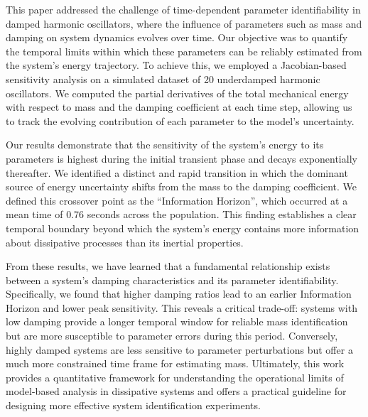 \documentclass[]{article}
\begin{document}
This paper addressed the challenge of time-dependent parameter identifiability in damped harmonic oscillators, where the influence of parameters such as mass and damping on system dynamics evolves over time. Our objective was to quantify the temporal limits within which these parameters can be reliably estimated from the system's energy trajectory. To achieve this, we employed a Jacobian-based sensitivity analysis on a simulated dataset of 20 underdamped harmonic oscillators. We computed the partial derivatives of the total mechanical energy with respect to mass and the damping coefficient at each time step, allowing us to track the evolving contribution of each parameter to the model's uncertainty.

Our results demonstrate that the sensitivity of the system's energy to its parameters is highest during the initial transient phase and decays exponentially thereafter. We identified a distinct and rapid transition in which the dominant source of energy uncertainty shifts from the mass to the damping coefficient. We defined this crossover point as the ``Information Horizon'', which occurred at a mean time of 0.76 seconds across the population. This finding establishes a clear temporal boundary beyond which the system's energy contains more information about dissipative processes than its inertial properties.

From these results, we have learned that a fundamental relationship exists between a system's damping characteristics and its parameter identifiability. Specifically, we found that higher damping ratios lead to an earlier Information Horizon and lower peak sensitivity. This reveals a critical trade-off: systems with low damping provide a longer temporal window for reliable mass identification but are more susceptible to parameter errors during this period. Conversely, highly damped systems are less sensitive to parameter perturbations but offer a much more constrained time frame for estimating mass. Ultimately, this work provides a quantitative framework for understanding the operational limits of model-based analysis in dissipative systems and offers a practical guideline for designing more effective system identification experiments.
\end{document}
